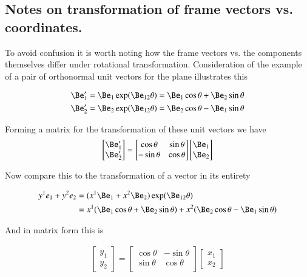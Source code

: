 \documentclass{article}
\begin{document}
\subsection{ Notes on transformation of frame vectors vs. coordinates. }

To avoid confusion it is worth noting how the frame vectors vs. the components themselves differ under
rotational transformation.  Consideration of the example of a pair of orthonormal unit vectors for the plane illustrates this

\begin{align*}
\Be_1' &= \Be_1 \exp(\Be_{12}\theta) = \Be_1 \cos\theta + \Be_2 \sin\theta \\
\Be_2' &= \Be_2 \exp(\Be_{12}\theta) = \Be_2 \cos\theta - \Be_1 \sin\theta \\
\end{align*}

Forming a matrix for the transformation of these unit vectors we have
\begin{align*}
\begin{bmatrix}
\Be_1' \\
\Be_2'
\end{bmatrix}
=
\begin{bmatrix}
\cos\theta & \sin\theta \\
- \sin\theta & \cos\theta \\
\end{bmatrix}
\begin{bmatrix}
\Be_1 \\
\Be_2
\end{bmatrix}
\end{align*}

Now compare this to the transformation of a vector in its entirety

\begin{align*}
y^1 e_1 + y^2 e_2 
&= ( x^1 \Be_1 + x^2 \Be_2 ) \exp(\Be_{12}\theta) \\
&= x^1(\Be_1 \cos\theta + \Be_2 \sin\theta) 
 + x^2(\Be_2 \cos\theta - \Be_1 \sin\theta) \\
\end{align*}

And in matrix form this is

\begin{align*}
\begin{bmatrix}
y_1 \\
y_2
\end{bmatrix}
=
\begin{bmatrix}
\cos\theta & -\sin\theta \\
\sin\theta & \cos\theta \\
\end{bmatrix}
\begin{bmatrix}
x_1 \\
x_2
\end{bmatrix}
\end{align*}
\end{document}
